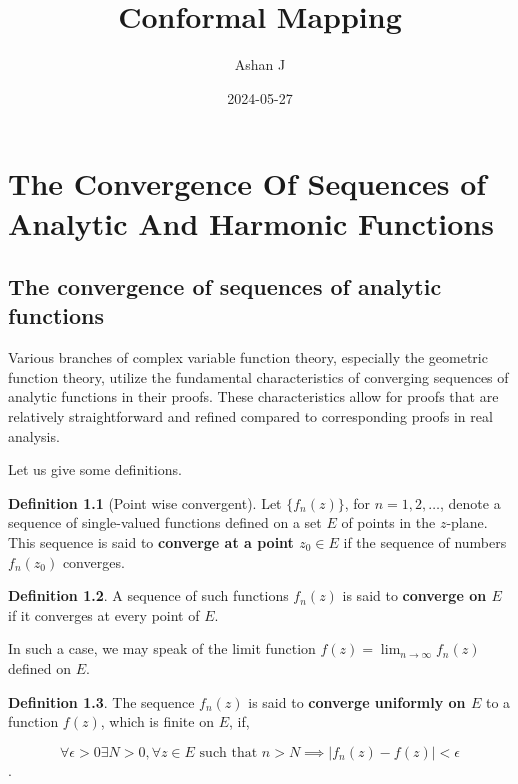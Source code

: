\documentclass[
]{book}
\title{Conformal Mapping}
\author{Ashan J}
\date{2024-05-27}
\theoremstyle{definition}
\newtheorem{definition}{Definition}[chapter]
\theoremstyle{definition}
\theoremstyle{definition}
\theoremstyle{definition}
\theoremstyle{remark}
\begin{document}
\maketitle

{
\setcounter{tocdepth}{1}
\tableofcontents
}
\chapter{The Convergence Of Sequences of Analytic And Harmonic Functions}\label{the-convergence-of-sequences-of-analytic-and-harmonic-functions}

\section{The convergence of sequences of analytic functions}\label{the-convergence-of-sequences-of-analytic-functions}

Various branches of complex variable function theory, especially the geometric function theory, utilize the fundamental characteristics of converging sequences of analytic functions in their proofs. These characteristics allow for proofs that are relatively straightforward and refined compared to corresponding proofs in real analysis.

Let us give some definitions.

\begin{definition}[Point wise convergent]
\protect\hypertarget{def:unnamed-chunk-1}{}\label{def:unnamed-chunk-1}Let \(\{f_n (z)\}\), for \(n = 1, 2, \ldots\), denote a sequence of single-valued functions defined on a set \(E\) of points in the \(z\)-plane.
This sequence is said to \textbf{converge at a point \(z_0 \in E\)} if the sequence of numbers \(f_n (z_0)\) converges.
\end{definition}

\begin{definition}
\protect\hypertarget{def:unnamed-chunk-2}{}\label{def:unnamed-chunk-2}A sequence of such functions \(f_n (z)\) is said to \textbf{converge on \(E\)} if it converges at every point of \(E\).

In such a case, we may speak of the limit function \(f(z) = \lim_{n\to\infty} f_n (z)\) defined on \(E\).
\end{definition}

\begin{definition}
\protect\hypertarget{def:unnamed-chunk-3}{}\label{def:unnamed-chunk-3}The sequence \({f_n (z)}\) is said to \textbf{converge uniformly on \(E\)} to a function \(f(z)\), which is finite on \(E\), if,

\[\forall \epsilon > 0 \exists N > 0 , \forall z \in E \text{ such that } n > N \implies |f_n (z) - f(z)| < \epsilon \].
\end{definition}
\end{document}
